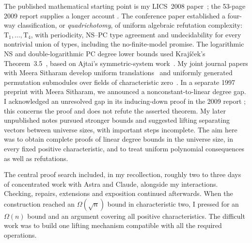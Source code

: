 \documentclass[11pt,a4paper,oneside,openany]{book}
\theoremstyle{definition}\newtheorem{definition}[theorem]{Definition}
\theoremstyle{remark}\newtheorem{remark}[theorem]{Remark}
\numberwithin{equation}{chapter}
\begin{document}
The published mathematical starting point is my LICS~2008
paper~\cite{Riis}; the 53-page 2009 report supplies a longer account
\cite{RiisLong}. The conference paper established a four-way
classification, or \emph{quadrichotomy}, of uniform algebraic
refutation complexity: $\mathrm T_1,\ldots,\mathrm T_4$, with
periodicity, NS--PC type agreement and undecidability for every
nontrivial union of types, including the no-finite-model promise.
The logarithmic NS and double-logarithmic PC degree lower bounds used
Kraj\'i\v cek's Theorem~3.5~\cite{Krajicek}, based on Ajtai's
symmetric-system work~\cite{Ajtai}.
My joint journal papers with Meera Sitharam develop uniform
translations~\cite{RiisSitharamTautologies} and uniformly generated
permutation submodules over fields of characteristic
zero~\cite{RiisSitharamModules}. In a separate 1997 preprint with Meera Sitharam, we announced
a nonconstant-to-linear degree gap. I acknowledged an unresolved
gap in its inducing-down proof in the 2009 report
\cite[p.~50, footnote~3; p.~53, reference~33]{RiisLong}; this concerns
the proof and does not refute the asserted theorem. My later
unpublished notes pursued stronger bounds and suggested lifting
separating vectors between universe sizes, with important steps incomplete.
The aim here was to obtain complete proofs of linear degree bounds in
the universe size, in every fixed positive characteristic, and to treat
uniform polynomial consequences as well as refutations.

The central proof search included, in my recollection, roughly two to
three days of concentrated work with Astra and Claude, alongside my
interactions. Checking, repairs, extensions and exposition continued
afterwards. When the construction reached an $\Omega(\sqrt n)$ bound in
characteristic two, I pressed for an $\Omega(n)$ bound and an argument
covering all positive characteristics. The difficult work was to build
one lifting mechanism compatible with all the required operations.
\end{document}
